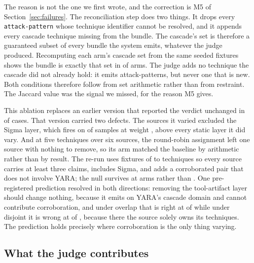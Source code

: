 The reason is not the one we first wrote, and the correction is M5 of Section~\ref{sec:failures}.
The reconciliation step does two things. It drops every \texttt{attack-pattern} whose technique
identifier cannot be resolved, and it appends every cascade technique missing from the bundle. The
cascade's set is therefore a guaranteed subset of every bundle the system emits, whatever the judge
produced. Recomputing each arm's cascade set from the same seeded fixtures shows the bundle is exactly that
set in  of  arms. The judge adds no technique
the cascade did not already hold: it emits attack-patterns, but never one that is new. Both
conditions therefore follow from set arithmetic rather than from restraint. The Jaccard value was the signal we
missed, for the reason M5 gives.

This ablation replaces an earlier version that reported the verdict unchanged in
 of  cases. That version carried
two defects. The sources it varied excluded the Sigma layer, which fires on  of
 samples at weight , above every static layer it did vary.
And at five techniques over six sources, the round-robin assignment left one source with nothing to
remove, so its arm matched the baseline by arithmetic rather than by result. The re-run uses fixtures of
 to  techniques so every source carries
at least three claims, includes Sigma, and adds a corroborated pair that does not involve YARA; the
null survives at  arms rather than . One
pre-registered prediction resolved in both directions: removing the tool-artifact layer should
change nothing, because it emits on YARA's cascade domain and cannot contribute corroboration, and
under overlap that is right at  of
 while under disjoint it is wrong at
 of , because there the
source solely owns its techniques. The prediction holds precisely where corroboration is the only
thing varying.

\subsection{What the judge contributes}\label{sec:judge}


